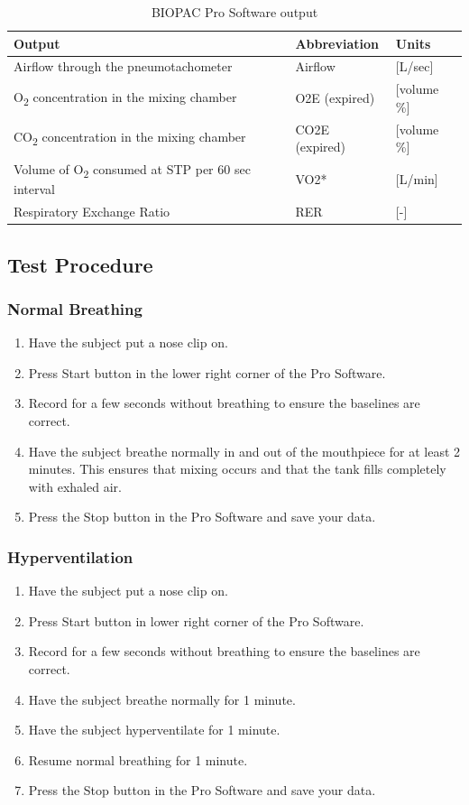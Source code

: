 \documentclass{article}
\begin{document}
\begin{table}[h]
	\centering
	\caption{BIOPAC Pro Software output}
	\begin{tabular}[h!]{p{}|p{}|p{}}
	\toprule
	Output & Abbreviation & Units\\
	\midrule
	Airflow through the pneumotachometer & Airflow & [L/sec]\\
	O\textsubscript{2} concentration in the mixing chamber & O2E (expired) & [volume \%]\\
	CO\textsubscript{2} concentration in the mixing chamber & CO2E (expired) & [volume \%]\\
	Volume of O\textsubscript{2} consumed at STP per 60 sec interval & VO2* & [L/min]\\
	Respiratory Exchange Ratio & RER & [-]\\
	\bottomrule
	\end{tabular}
	\label{abbreviation}
	\end{table}

\subsection*{Test Procedure}
\subsubsection*{Normal Breathing}
\begin{enumerate}
	\item Have the subject put a nose clip on.
	\item Press Start button in the lower right corner of the Pro Software.
	\item Record for a few seconds without breathing to ensure the baselines are correct.
	\item Have the subject breathe normally in and out of the mouthpiece for at least 2 minutes. This ensures that mixing occurs and that the tank fills completely with exhaled air.
	\item Press the Stop button in the Pro Software and save your data.
\end{enumerate}

\subsubsection*{Hyperventilation}
\begin{enumerate}
	\item Have the subject put a nose clip on.
	\item Press Start button in lower right corner of the Pro Software.
	\item Record for a few seconds without breathing to ensure the baselines are correct.
	\item Have the subject breathe normally for 1 minute.
	\item Have the subject hyperventilate for 1 minute.
	\item Resume normal breathing for 1 minute.
	\item Press the Stop button in the Pro Software and save your data.
\end{enumerate}
\end{document}
